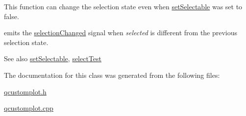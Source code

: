 This function can change the selection state even when \hyperlink{classQCPAbstractItem_a8a8e32a55bc478b849756a78c2d87fd2}{set\+Selectable} was set to false.

emits the \hyperlink{classQCPAbstractItem_aa5cffb034fc65dbb91c77e02c1c14251}{selection\+Changed} signal when {\itshape selected} is different from the previous selection state.

\begin{DoxySeeAlso}{See also}
\hyperlink{classQCPAbstractItem_a8a8e32a55bc478b849756a78c2d87fd2}{set\+Selectable}, \hyperlink{classQCPAbstractItem_a96d522d10ffc0413b9a366c6f7f0476b}{select\+Test} 
\end{DoxySeeAlso}


The documentation for this class was generated from the following files\+:\begin{DoxyCompactItemize}
\item 
\hyperlink{qcustomplot_8h}{qcustomplot.\+h}\item 
\hyperlink{qcustomplot_8cpp}{qcustomplot.\+cpp}\end{DoxyCompactItemize}
